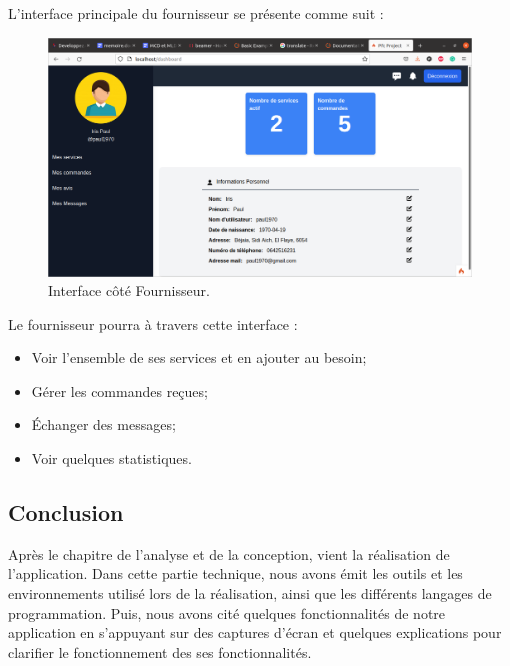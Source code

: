 \documentclass[french]{report}
\begin{document}
            L'interface principale du fournisseur se présente comme suit :
            
            \begin{figure}[H]
                \centering
                \includegraphics[width=1\textwidth]{images/fourni main.png} 
                \caption{Interface côté Fournisseur.}
            \end{figure}
            
            Le fournisseur pourra à travers cette interface : 
            \begin{itemize}
                \item Voir l'ensemble de ses services et en ajouter au besoin;
                \item Gérer les commandes reçues;
                \item Échanger des messages;
                \item Voir quelques statistiques.
                
            \end{itemize}
            
            \subsection{Conclusion}
            
            Après le chapitre de l'analyse et de la conception, vient la 
	    réalisation de l'application. Dans cette partie technique, 
	    nous avons émit les outils et les environnements utilisé lors
	    de la réalisation, ainsi que les différents langages de programmation.
	    Puis, nous avons cité quelques fonctionnalités de notre application en
	    s'appuyant sur des captures d'écran et quelques explications pour clarifier
	    le fonctionnement des ses fonctionnalités.
            
\end{document}
